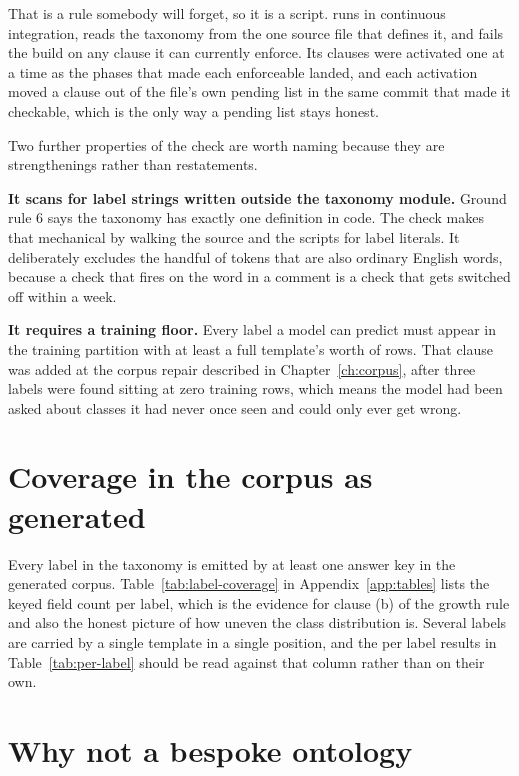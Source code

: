 That is a rule somebody will forget, so it is a script.
 runs in continuous integration, reads the
taxonomy from the one source file that defines it, and fails the build on any
clause it can currently enforce. Its clauses were activated one at a time as the
phases that made each enforceable landed, and each activation moved a clause out
of the file's own pending list in the same commit that made it checkable, which
is the only way a pending list stays honest.

Two further properties of the check are worth naming because they are
strengthenings rather than restatements.

\textbf{It scans for label strings written outside the taxonomy module.} Ground
rule 6 says the taxonomy has exactly one definition in code. The check makes
that mechanical by walking the source and the scripts for label literals. It
deliberately excludes the handful of tokens that are also ordinary English
words, because a check that fires on the word  in a comment is a
check that gets switched off within a week.

\textbf{It requires a training floor.} Every label a model can predict must
appear in the training partition with at least a full template's worth of rows.
That clause was added at the corpus repair described in
Chapter~\ref{ch:corpus}, after three labels were found sitting at zero training
rows, which means the model had been asked about classes it had never once seen
and could only ever get wrong.

\section{Coverage in the corpus as generated}

Every label in the taxonomy is emitted by at least one answer key in the
generated corpus. Table~\ref{tab:label-coverage} in Appendix~\ref{app:tables}
lists the keyed field count per label, which is the evidence for clause (b) of
the growth rule and also the honest picture of how uneven the class distribution
is. Several labels are carried by a single template in a single position, and
the per label results in Table~\ref{tab:per-label} should be read against that
column rather than on their own.

\section{Why not a bespoke ontology}


